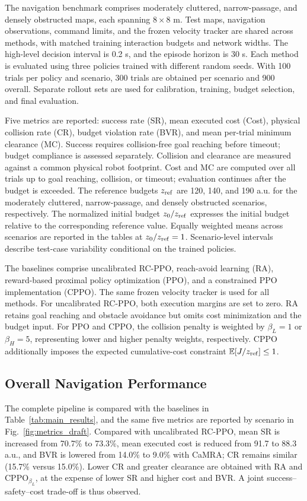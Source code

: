 \documentclass[conference]{IEEEtran}
\begin{document}
The navigation benchmark comprises moderately cluttered, narrow-passage, and
densely obstructed maps, each spanning $8\times8$ m. Test maps, navigation
observations, command limits, and the frozen velocity tracker are shared across
methods, with matched training interaction budgets and network widths. The
high-level decision interval is 0.2 s, and the episode horizon is 30 s. Each method
is evaluated using three policies trained with different random seeds. With
100 trials per policy and scenario, 300 trials are obtained per scenario and
900 overall. Separate rollout sets are used for calibration, training, budget
selection, and final evaluation.

Five metrics are reported: success rate (SR), mean executed cost (Cost), physical
collision rate (CR), budget violation rate (BVR), and mean per-trial minimum
clearance (MC). Success requires collision-free goal reaching before timeout;
budget compliance is assessed separately. Collision and clearance are measured
against a common physical robot footprint. Cost and MC are computed over all
trials up to goal reaching, collision, or timeout; evaluation continues after
the budget is exceeded. The reference budgets
$z_{\rm ref}$ are 120, 140, and 190 a.u. for the moderately cluttered,
narrow-passage, and densely obstructed scenarios, respectively. The normalized
initial budget $z_0/z_{\rm ref}$ expresses the initial budget relative to the
corresponding reference value. Equally weighted means across scenarios are
reported in the tables at $z_0/z_{\rm ref}=1$. Scenario-level intervals describe
test-case variability conditional on the trained policies.

The baselines comprise uncalibrated RC-PPO, reach-avoid learning (RA), reward-based
proximal policy optimization (PPO), and a constrained PPO implementation (CPPO).
The same frozen velocity tracker is used for all methods. For uncalibrated RC-PPO,
both execution margins are set to zero. RA retains goal reaching and obstacle
avoidance but omits cost minimization and the budget input. For PPO and CPPO,
the collision penalty is weighted by $\beta_L=1$ or $\beta_H=5$, representing
lower and higher penalty weights, respectively. CPPO additionally imposes the
expected cumulative-cost constraint $\mathbb{E}[J/z_{\rm ref}]\leq1$.

\subsection{Overall Navigation Performance}
\label{sec:overall_performance}
The complete pipeline is compared with the baselines in Table~\ref{tab:main_results},
and the same five metrics are reported by scenario in Fig.~\ref{fig:metrics_draft}.
Compared with uncalibrated RC-PPO, mean SR is increased from 70.7\% to
73.3\%, mean executed cost is reduced from 91.7 to 88.3 a.u., and BVR is lowered from
14.0\% to 9.0\% with CaMRA; CR remains similar (15.7\% versus 15.0\%). Lower CR
and greater clearance are obtained with RA and CPPO$_{\beta_L}$, at the expense of
lower SR and higher cost and BVR. A joint success--safety--cost trade-off is thus observed.
\end{document}
